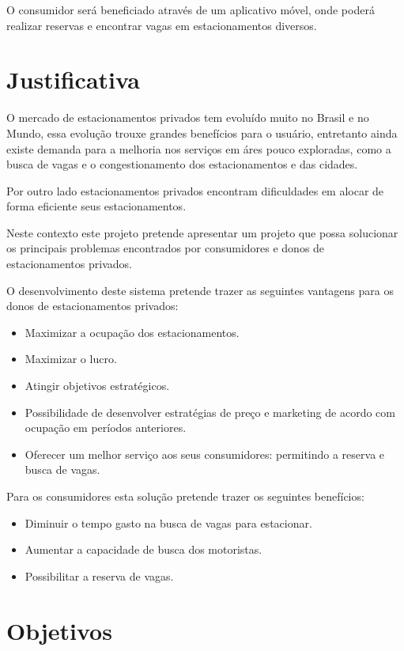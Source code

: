 O consumidor será beneficiado através de um aplicativo móvel, onde poderá realizar reservas e encontrar vagas em estacionamentos diversos.


\section{Justificativa}

O mercado de estacionamentos privados tem evoluído muito no Brasil e no Mundo, essa evolução trouxe grandes benefícios para o usuário, entretanto ainda existe demanda para a melhoria nos serviços em áres pouco exploradas, como a busca de vagas e o congestionamento dos estacionamentos e das cidades.

Por outro lado estacionamentos privados encontram dificuldades em alocar de forma eficiente seus estacionamentos.

Neste contexto este projeto pretende apresentar um projeto que possa solucionar os principais problemas encontrados por consumidores e donos de estacionamentos privados.

O desenvolvimento deste sistema pretende trazer as seguintes vantagens para os donos de estacionamentos privados:
\begin{itemize}
	\item Maximizar a ocupação dos estacionamentos.%
	\item Maximizar o lucro.
	\item Atingir objetivos estratégicos.
	\item Possibilidade de desenvolver estratégias de preço e marketing de acordo com ocupação em períodos anteriores.
	\item Oferecer um melhor serviço aos seus consumidores: permitindo a reserva e busca de vagas.
\end{itemize}

Para os consumidores esta solução pretende trazer os seguintes benefícios:
\begin{itemize}
	\item Diminuir o tempo gasto na busca de vagas para estacionar.
	\item Aumentar a capacidade de busca dos motoristas.
	\item Possibilitar a reserva de vagas.
\end{itemize}

\section{Objetivos}

